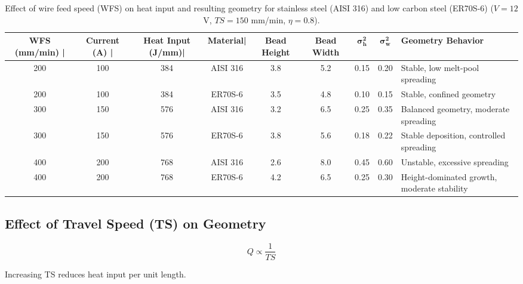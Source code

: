 \documentclass[conference]{IEEEtran}
\begin{document}
\begin{table}[t]
\centering
\footnotesize
\setlength{\tabcolsep}{2.0 pt}
\renewcommand{\arraystretch}{1.15}

\caption{Effect of wire feed speed (WFS) on heat input and resulting geometry for stainless steel (AISI 316) and low carbon steel (ER70S-6) ($V=12$ V, $TS=150$ mm/min, $\eta=0.8$).}
\label{tab:wfs_geometry_comparison}

\begin{tabular}{c c c c c c c c p{3.2cm}}
\toprule
\resize\textbf{WFS (mm/min)} | & \textbf{Current (A)} |& \textbf{Heat Input (J/mm)}| & \textbf{Material}| & \textbf{Bead Height} & \textbf{Bead Width} & $\boldsymbol{\sigma_h^2}$ & $\boldsymbol{\sigma_w^2}$ & \textbf{Geometry Behavior} \\
\midrule

200 & 100 & 384 & AISI 316 & 3.8 & 5.2 & 0.15 & 0.20 & Stable, low melt-pool spreading \\
200 & 100 & 384 & ER70S-6  & 3.5 & 4.8 & 0.10 & 0.15 & Stable, confined geometry \\

\midrule

300 & 150 & 576 & AISI 316 & 3.2 & 6.5 & 0.25 & 0.35 & Balanced geometry, moderate spreading \\
300 & 150 & 576 & ER70S-6  & 3.8 & 5.6 & 0.18 & 0.22 & Stable deposition, controlled spreading \\

\midrule

400 & 200 & 768 & AISI 316 & 2.6 & 8.0 & 0.45 & 0.60 & Unstable, excessive spreading \\
400 & 200 & 768 & ER70S-6  & 4.2 & 6.5 & 0.25 & 0.30 & Height-dominated growth, moderate stability \\

\bottomrule
\end{tabular}

\end{table}

\subsection{Effect of Travel Speed (TS) on Geometry}

\begin{equation}
Q \propto \frac{1}{TS}
\end{equation}

Increasing TS reduces heat input per unit length.
\end{document}
